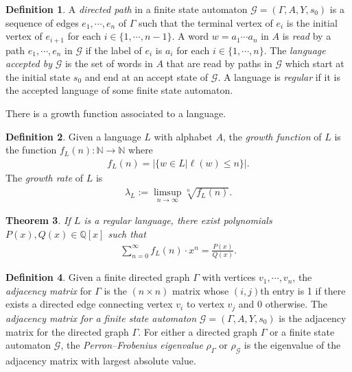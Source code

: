 \documentclass[11pt,letterpaper]{amsart}
\newtheorem{theorem}{Theorem}[section]
\theoremstyle{definition}
\newtheorem{definition}[theorem]{Definition}
\theoremstyle{plain}
\theoremstyle{TheoremNum}
\begin{document}
\begin{definition}
    A \emph{directed path} in a finite state automaton $\mathcal{G} = (\Gamma, A, Y, s_0)$ is a sequence of edges $e_1, \cdots, e_n$ of $\Gamma$ such that the terminal vertex of $e_i$ is the initial vertex of $e_{i+1}$ for each $i \in \{1, \cdots, n-1\}$. A word $w = a_1 \cdots a_n$ in $A$ is \emph{read} by a path $e_1, \cdots, e_n$ in $\mathcal{G}$ if the label of $e_i$ is $a_i$ for each $i \in \{1, \cdots, n \}$. The \emph{language accepted by} $\mathcal{G}$ is the set of words in $A$ that are read by paths in $\mathcal{G}$ which start at the initial state $s_0$ and end at an accept state of $\mathcal{G}$. A language is \emph{regular} if it is the accepted language of some finite state automaton. 
\end{definition}

There is a growth function associated to a language.
\begin{definition}
    Given a language $L$ with alphabet $A$, the \emph{growth function} of $L$ is the function $f_{L}(n) : \mathbb{N} \rightarrow \mathbb{N}$ where
    \begin{align*}
        f_L(n) = |\{w \in L | \ell(w) \leq n\}|\text{.}
    \end{align*}
    The \emph{growth rate} of $L$ is
    \begin{align*}
        \lambda_{L} := \limsup_{n \rightarrow \infty} \sqrt[n]{f_{L}(n)}\text{.}
    \end{align*}
\end{definition}

\begin{theorem}\cite[Theorem~7]{Cannon-regular-geodesics}\label{thm:polynomial-growth}
    If $L$ is a regular language, there exist polynomials $P(x), Q(x) \in \mathbb{Q}[x]$ such that
    \begin{align*}
        \sum_{n=0}^{\infty} f_L(n) \cdot x^n  = \frac{P(x)}{Q(x)}\text{.}
    \end{align*}
\end{theorem}

\begin{definition}
    Given a finite directed graph $\Gamma$ with vertices $v_1, \cdots, v_n$, the \emph{adjacency matrix} for $\Gamma$ is the $(n \times n)$ matrix whose $(i,j)$th entry is 1 if there exists a directed edge connecting vertex $v_i$ to vertex $v_j$ and 0 otherwise. The \emph{adjacency matrix for a finite state automaton} $\mathcal{G} = (\Gamma, A, Y, s_0)$ is the adjacency matrix for the directed graph $\Gamma$. For either a directed graph $\Gamma$ or a finite state automaton $\mathcal{G}$, the \emph{Perron--Frobenius eigenvalue} $\rho_{\Gamma}$ or $\rho_{\mathcal{G}}$ is the eigenvalue of the adjacency matrix with largest absolute value.
\end{definition}
\end{document}
